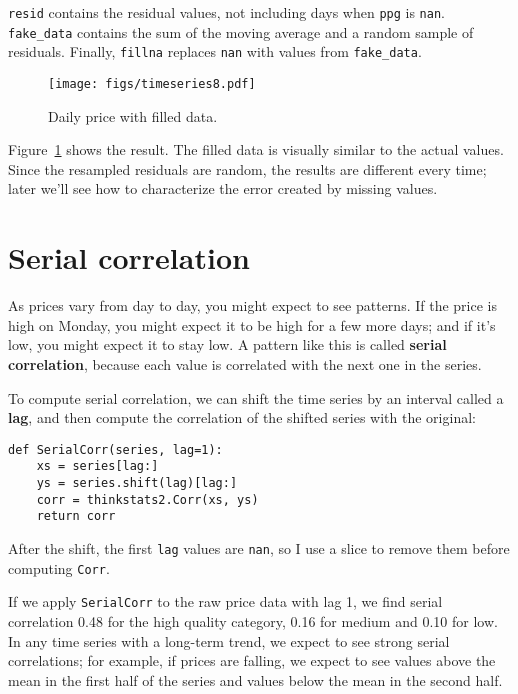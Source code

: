 {\tt resid} contains the residual values, not including days
when {\tt ppg} is {\tt nan}.  \verb"fake_data" contains the
sum of the moving average and a random sample of residuals.
Finally, {\tt fillna} replaces {\tt nan} with values from
\verb"fake_data".

\begin{figure}
\centerline{\texttt{[image: figs/timeseries8.pdf]}}
\caption{Daily price with filled data.}
\label{timeseries8}
\end{figure}

Figure~\ref{timeseries8} shows the result.  The filled data is visually
similar to the actual values.  Since the resampled residuals are
random, the results are different every time; later we'll see how
to characterize the error created by missing values.


\section{Serial correlation}

As prices vary from day to day, you might expect to see patterns.
If the price is high on Monday,
you might expect it to be high for a few more days; and
if it's low, you might expect it to stay low.  A pattern
like this is called {\bf serial
correlation}, because each value is correlated with the next one
in the series.

To compute serial correlation, we can shift the time series
by an interval called a {\bf lag}, and then compute the correlation
of the shifted series with the original:

\begin{verbatim}
def SerialCorr(series, lag=1):
    xs = series[lag:]
    ys = series.shift(lag)[lag:]
    corr = thinkstats2.Corr(xs, ys)
    return corr
\end{verbatim}

After the shift, the first {\tt lag} values are {\tt nan}, so
I use a slice to remove them before computing {\tt Corr}.


If we apply {\tt SerialCorr} to the raw price data with lag 1, we find
serial correlation 0.48 for the high quality category, 0.16 for
medium and 0.10 for low.  In any time series with a long-term trend,
we expect to see strong serial correlations; for example, if prices
are falling, we expect to see values above the mean in the first
half of the series and values below the mean in the second half.

